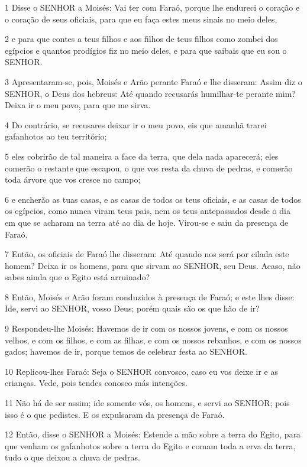 \par 1 Disse o SENHOR a Moisés: Vai ter com Faraó, porque lhe endureci o coração e o coração de seus oficiais, para que eu faça estes meus sinais no meio deles,
\par 2 e para que contes a teus filhos e aos filhos de teus filhos como zombei dos egípcios e quantos prodígios fiz no meio deles, e para que saibais que eu sou o SENHOR.
\par 3 Apresentaram-se, pois, Moisés e Arão perante Faraó e lhe disseram: Assim diz o SENHOR, o Deus dos hebreus: Até quando recusarás humilhar-te perante mim? Deixa ir o meu povo, para que me sirva.
\par 4 Do contrário, se recusares deixar ir o meu povo, eis que amanhã trarei gafanhotos ao teu território;
\par 5 eles cobrirão de tal maneira a face da terra, que dela nada aparecerá; eles comerão o restante que escapou, o que vos resta da chuva de pedras, e comerão toda árvore que vos cresce no campo;
\par 6 e encherão as tuas casas, e as casas de todos os teus oficiais, e as casas de todos os egípcios, como nunca viram teus pais, nem os teus antepassados desde o dia em que se acharam na terra até ao dia de hoje. Virou-se e saiu da presença de Faraó.
\par 7 Então, os oficiais de Faraó lhe disseram: Até quando nos será por cilada este homem? Deixa ir os homens, para que sirvam ao SENHOR, seu Deus. Acaso, não sabes ainda que o Egito está arruinado?
\par 8 Então, Moisés e Arão foram conduzidos à presença de Faraó; e este lhes disse: Ide, servi ao SENHOR, vosso Deus; porém quais são os que hão de ir?
\par 9 Respondeu-lhe Moisés: Havemos de ir com os nossos jovens, e com os nossos velhos, e com os filhos, e com as filhas, e com os nossos rebanhos, e com os nossos gados; havemos de ir, porque temos de celebrar festa ao SENHOR.
\par 10 Replicou-lhes Faraó: Seja o SENHOR convosco, caso eu vos deixe ir e as crianças. Vede, pois tendes conosco más intenções.
\par 11 Não há de ser assim; ide somente vós, os homens, e servi ao SENHOR; pois isso é o que pedistes. E os expulsaram da presença de Faraó.
\par 12 Então, disse o SENHOR a Moisés: Estende a mão sobre a terra do Egito, para que venham os gafanhotos sobre a terra do Egito e comam toda a erva da terra, tudo o que deixou a chuva de pedras.
